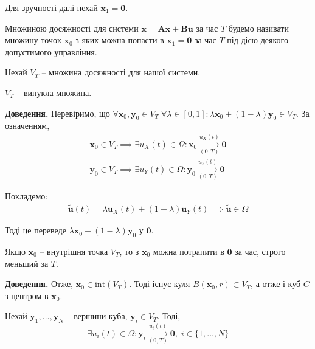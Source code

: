 \documentclass[14pt]{extarticle}
\newcommand{\<}{\langle}
\renewcommand{\>}{\rangle}
\theoremstyle{mystyle}{\newtheorem{definition}{Definition}[section]}
\theoremstyle{mystyle}{\newtheorem{proposition}[definition]{Proposition}}
\theoremstyle{mystyle}{\newtheorem{theorem}[definition]{Theorem}}
\theoremstyle{mystyle}{\newtheorem{lemma}[definition]{Lemma}}
\theoremstyle{mystyle}{\newtheorem{corollary}[definition]{Corollary}}
\theoremstyle{mystyle}{\newtheorem*{remark}{Remark}}
\theoremstyle{mystyle}{\newtheorem*{remarks}{Remarks}}
\theoremstyle{mystyle}{\newtheorem*{example}{Example}}
\theoremstyle{mystyle}{\newtheorem*{examples}{Examples}}
\theoremstyle{definition}{\newtheorem*{exercise}{Exercise}}
\theoremstyle{cstyle}{\newtheorem*{cthm}{}}
\theoremstyle{warn}
\begin{document}
Для зручності далі нехай $\mathbf{x}_1=\mathbf{0}$.

\begin{definition}
    Множиною досяжності для системи $\dot{\mathbf{x}} = \boldsymbol{A}\mathbf{x} + \boldsymbol{B}\mathbf{u}$ за час $T$ будемо називати множину точок $\mathbf{x}_0$ з яких можна попасти в $\mathbf{x}_1=\mathbf{0}$ за час $T$ під дією деякого допустимого управління.
\end{definition}

Нехай $V_T$ -- множина досяжності для нашої системи.

\begin{lemma}
    $V_T$ -- випукла множина.
\end{lemma}

\textbf{Доведення.} Перевіримо, що $\forall \mathbf{x}_0,\mathbf{y}_0 \in V_T \; \forall \lambda \in [0,1]: \lambda\mathbf{x}_0+(1-\lambda)\mathbf{y}_0 \in V_T$. За означенням,
\begin{gather}
    \mathbf{x}_0 \in V_T \implies \exists u_X(t) \in \Omega: \mathbf{x}_0 \xrightarrow[(0,T)]{u_X(t)} \mathbf{0} \\
    \mathbf{y}_0 \in V_T \implies \exists u_Y(t) \in \Omega: \mathbf{y}_0 \xrightarrow[(0,T)]{u_Y(t)} \mathbf{0}
\end{gather}

Покладемо:
\begin{gather}
    \widetilde{\mathbf{u}}(t) = \lambda\mathbf{u}_X(t) + (1-\lambda)\mathbf{u}_Y(t) \implies \widetilde{\boldsymbol{u}} \in \Omega
\end{gather}

Тоді це переведе $\lambda\mathbf{x}_0+(1-\lambda)\mathbf{y}_0$ у $\mathbf{0}$.

\begin{lemma}
    Якщо $\mathbf{x}_0$ -- внутрішня точка $V_T$, то з $\mathbf{x}_0$ можна потрапити в $\mathbf{0}$ за час, строго меньший за $T$.
\end{lemma}

\textbf{Доведення.} Отже, $\mathbf{x}_0 \in \text{int}(V_T)$. Тоді існує куля $B(\mathbf{x}_0,r) \subset V_T$, а отже і куб $C$ з центром в $\mathbf{x}_0$. 

Нехай $\mathbf{y}_1,\dots,\mathbf{y}_N$ -- вершини куба, $\mathbf{y}_i \in V_T$. Тоді, 
\begin{equation}
    \exists u_i(t) \in \Omega: \mathbf{y}_i \xrightarrow[(0,T)]{u_i(t)} \mathbf{0}, \; i \in \{1,\dots,N\}
\end{equation}
\end{document}
